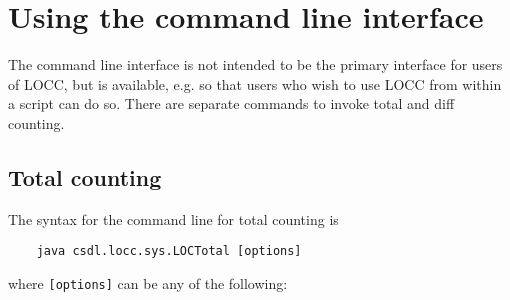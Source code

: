\section{Using the command line interface}

The command line interface is not intended to be the primary interface 
for users of LOCC, but is available, e.g. so that users who wish to
use LOCC from within a script can do so.  There are separate commands
to invoke total and diff counting.  

\subsection{Total counting}

The syntax for the command line for total counting is

\begin{verbatim}    java csdl.locc.sys.LOCTotal [options]\end{verbatim}

where {\tt [options]} can be any of the following:

